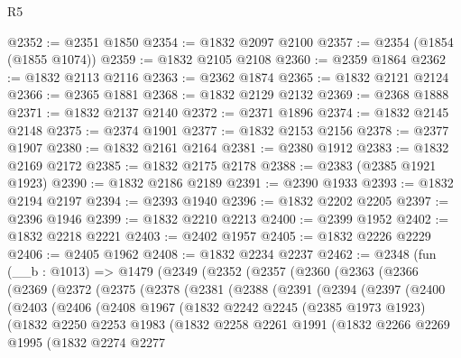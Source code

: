 \begin{lexlean}{R5}
\begin{coremodule}
@2352 := @2351 @1850
@2354 := @1832 @2097 @2100
@2357 := @2354 (@1854 (@1855 @1074))
@2359 := @1832 @2105 @2108
@2360 := @2359 @1864
@2362 := @1832 @2113 @2116
@2363 := @2362 @1874
@2365 := @1832 @2121 @2124
@2366 := @2365 @1881
@2368 := @1832 @2129 @2132
@2369 := @2368 @1888
@2371 := @1832 @2137 @2140
@2372 := @2371 @1896
@2374 := @1832 @2145 @2148
@2375 := @2374 @1901
@2377 := @1832 @2153 @2156
@2378 := @2377 @1907
@2380 := @1832 @2161 @2164
@2381 := @2380 @1912
@2383 := @1832 @2169 @2172
@2385 := @1832 @2175 @2178
@2388 := @2383 (@2385 @1921 @1923)
@2390 := @1832 @2186 @2189
@2391 := @2390 @1933
@2393 := @1832 @2194 @2197
@2394 := @2393 @1940
@2396 := @1832 @2202 @2205
@2397 := @2396 @1946
@2399 := @1832 @2210 @2213
@2400 := @2399 @1952
@2402 := @1832 @2218 @2221
@2403 := @2402 @1957
@2405 := @1832 @2226 @2229
@2406 := @2405 @1962
@2408 := @1832 @2234 @2237
@2462 := @2348
    (fun (__b : @1013) =>
    @1479
      (@2349
        (@2352
          (@2357
            (@2360
              (@2363
                (@2366
                  (@2369
                    (@2372
                      (@2375
                        (@2378
                          (@2381
                            (@2388
                              (@2391
                                (@2394
                                  (@2397
                                    (@2400
                                      (@2403
                                        (@2406
                                          (@2408
                                            @1967
                                            (@1832
                                              @2242
                                              @2245
                                              (@2385 @1973 @1923)
                                              (@1832
                                                @2250
                                                @2253
                                                @1983
                                                (@1832
                                                  @2258
                                                  @2261
                                                  @1991
                                                  (@1832
                                                    @2266
                                                    @2269
                                                    @1995
                                                    (@1832
                                                      @2274
                                                      @2277

\end{coremodule}
\end{lexlean}
